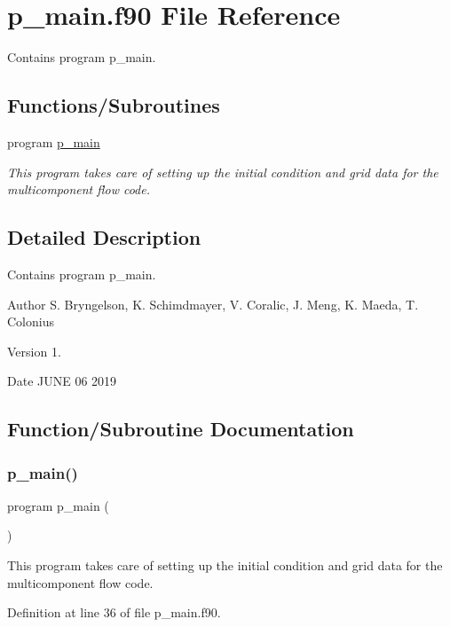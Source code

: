 \hypertarget{p__main_8f90}{}\section{p\+\_\+main.\+f90 File Reference}
\label{p__main_8f90}


Contains program p\+\_\+main.  


\subsection*{Functions/\+Subroutines}
\begin{DoxyCompactItemize}
\item 
program \hyperlink{p__main_8f90_aeec10ee8e2940c953967da3e374e1579}{p\+\_\+main}
\begin{DoxyCompactList}\small\item\em This program takes care of setting up the initial condition and grid data for the multicomponent flow code. \end{DoxyCompactList}\end{DoxyCompactItemize}


\subsection{Detailed Description}
Contains program p\+\_\+main. 

\begin{DoxyAuthor}{Author}
S. Bryngelson, K. Schimdmayer, V. Coralic, J. Meng, K. Maeda, T. Colonius 
\end{DoxyAuthor}
\begin{DoxyVersion}{Version}
1. 
\end{DoxyVersion}
\begin{DoxyDate}{Date}
J\+U\+NE 06 2019 
\end{DoxyDate}


\subsection{Function/\+Subroutine Documentation}
\mbox{\label{p__main_8f90_aeec10ee8e2940c953967da3e374e1579}} 
\subsubsection{\texorpdfstring{p\+\_\+main()}{p\_main()}}
{\footnotesize\ttfamily program p\+\_\+main (\begin{DoxyParamCaption}{ }\end{DoxyParamCaption})}



This program takes care of setting up the initial condition and grid data for the multicomponent flow code. 



Definition at line 36 of file p\+\_\+main.\+f90.

